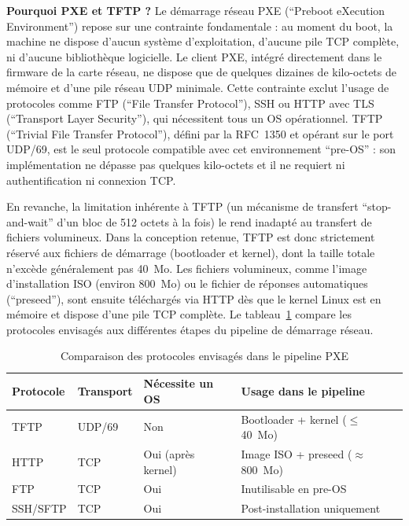 \par \textbf{Pourquoi PXE et TFTP ?} Le démarrage réseau PXE (``Preboot eXecution Environment'') repose sur une contrainte fondamentale : au moment du boot, la machine ne dispose d'aucun système d'exploitation, d'aucune pile TCP complète, ni d'aucune bibliothèque logicielle. Le client PXE, intégré directement dans le firmware de la carte réseau, ne dispose que de quelques dizaines de kilo-octets de mémoire et d'une pile réseau UDP minimale. Cette contrainte exclut l'usage de protocoles comme FTP (``File Transfer Protocol''), SSH ou HTTP avec TLS (``Transport Layer Security''), qui nécessitent tous un OS opérationnel. TFTP (``Trivial File Transfer Protocol''), défini par la RFC~1350 et opérant sur le port UDP/69, est le seul protocole compatible avec cet environnement ``pre-OS'' : son implémentation ne dépasse pas quelques kilo-octets et il ne requiert ni authentification ni connexion TCP.\\

\par En revanche, la limitation inhérente à TFTP (un mécanisme de transfert ``stop-and-wait'' d'un bloc de 512 octets à la fois) le rend inadapté au transfert de fichiers volumineux. Dans la conception retenue, TFTP est donc strictement réservé aux fichiers de démarrage (bootloader et kernel), dont la taille totale n'excède généralement pas 40~Mo. Les fichiers volumineux, comme l'image d'installation ISO (environ 800~Mo) ou le fichier de réponses automatiques (``preseed''), sont ensuite téléchargés via HTTP dès que le kernel Linux est en mémoire et dispose d'une pile TCP complète. Le tableau~\ref{tab:pxe-protocols} compare les protocoles envisagés aux différentes étapes du pipeline de démarrage réseau.

\begin{table}[H]
\centering
\caption{Comparaison des protocoles envisagés dans le pipeline PXE}
\label{tab:pxe-protocols}
\begin{tabular}{|l|l|l|l|}
\hline
\textbf{Protocole} & \textbf{Transport} & \textbf{Nécessite un OS} & \textbf{Usage dans le pipeline} \\
\hline
TFTP & UDP/69 & Non & Bootloader + kernel ($\leq$40~Mo) \\
\hline
HTTP & TCP & Oui (après kernel) & Image ISO + preseed ($\approx$800~Mo) \\
\hline
FTP & TCP & Oui & Inutilisable en pre-OS \\
\hline
SSH/SFTP & TCP & Oui & Post-installation uniquement \\
\hline
\end{tabular}
\end{table}

